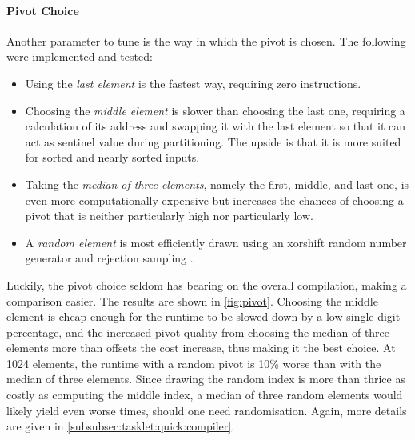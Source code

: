 \paragraph{Pivot Choice}
Another parameter to tune is the way in which the pivot is chosen.
The following were implemented and tested:
\begin{itemize}
	\item
	Using the \emph{last element} is the fastest way, requiring zero instructions.

	\item
	Choosing the \emph{middle element} is slower than choosing the last one, requiring a calculation of its address and swapping it with the last element so that it can act as sentinel value during partitioning.
	The upside is that it is more suited for sorted and nearly sorted inputs.

	\item
	Taking the \emph{median of three elements}, namely the first, middle, and last one, is even more computationally expensive but increases the chances of choosing a pivot that is neither particularly high nor particularly low.

	\item
	A \emph{random element} is most efficiently drawn using an xorshift random number generator and rejection sampling \cite{lukas_geis}.
\end{itemize}
Luckily, the pivot choice seldom has bearing on the overall compilation, making a comparison easier.
The results are shown in \cref{fig:pivot}.
Choosing the middle element is cheap enough for the runtime to be slowed down by a low single-digit percentage, and the increased pivot quality from choosing the median of three elements more than offsets the cost increase, thus making it the best choice.
At 1024 elements, the runtime with a random pivot is 10\% worse than with the median of three elements.
Since drawing the random index is more than thrice as costly as computing the middle index, a median of three random elements would likely yield even worse times, should one need randomisation.
Again, more details are given in \cref{subsubsec:tasklet:quick:compiler}.

